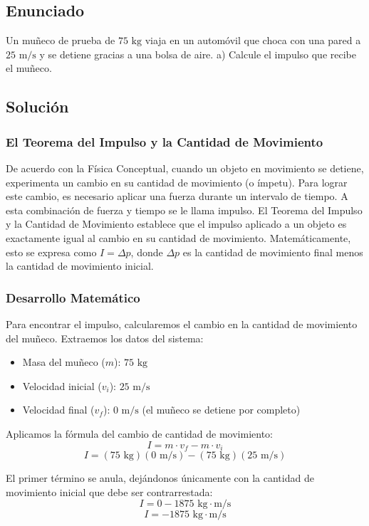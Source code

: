 \documentclass{article}
\begin{document}
\newpage

\subsection*{Enunciado}
Un muñeco de prueba de $75 \text{ kg}$ viaja en un automóvil que choca con una pared a $25 \text{ m/s}$ y se detiene gracias a una bolsa de aire. 
a) Calcule el impulso que recibe el muñeco.

\subsection*{Solución}

\subsubsection*{El Teorema del Impulso y la Cantidad de Movimiento}
De acuerdo con la Física Conceptual, cuando un objeto en movimiento se detiene, experimenta un cambio en su cantidad de movimiento (o ímpetu). Para lograr este cambio, es necesario aplicar una fuerza durante un intervalo de tiempo. A esta combinación de fuerza y tiempo se le llama impulso. El Teorema del Impulso y la Cantidad de Movimiento establece que el impulso aplicado a un objeto es exactamente igual al cambio en su cantidad de movimiento. Matemáticamente, esto se expresa como $I = \Delta p$, donde $\Delta p$ es la cantidad de movimiento final menos la cantidad de movimiento inicial.

\subsubsection*{Desarrollo Matemático}
Para encontrar el impulso, calcularemos el cambio en la cantidad de movimiento del muñeco. Extraemos los datos del sistema:
\begin{itemize}
    \item Masa del muñeco ($m$): $75 \text{ kg}$
    \item Velocidad inicial ($v_i$): $25 \text{ m/s}$
    \item Velocidad final ($v_f$): $0 \text{ m/s}$ (el muñeco se detiene por completo)
\end{itemize}

Aplicamos la fórmula del cambio de cantidad de movimiento:
$$I = m \cdot v_f - m \cdot v_i$$
$$I = (75 \text{ kg})(0 \text{ m/s}) - (75 \text{ kg})(25 \text{ m/s})$$

El primer término se anula, dejándonos únicamente con la cantidad de movimiento inicial que debe ser contrarrestada:
$$I = 0 - 1875 \text{ kg}\cdot\text{m/s}$$
$$I = -1875 \text{ kg}\cdot\text{m/s}$$
\end{document}
